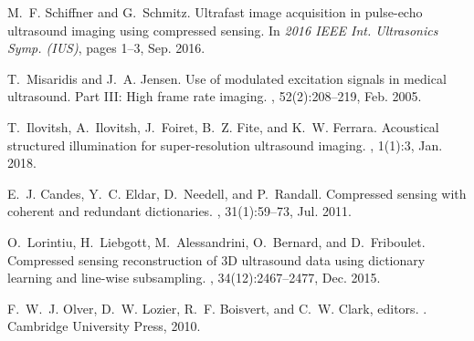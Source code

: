 \documentclass[10pt,twocolumn,romanappendices,final]{IEEEtran}
\begin{document}
\begin{thebibliography}{100}
M.~F. Schiffner and G.~Schmitz.
\newblock Ultrafast image acquisition in pulse-echo ultrasound imaging using
  compressed sensing.
\newblock In {\em 2016 IEEE Int. Ultrasonics Symp. (IUS)}, pages 1--3, Sep.
  2016.

T.~Misaridis and J.~A. Jensen.
\newblock Use of modulated excitation signals in medical ultrasound. {P}art
  {III}: {H}igh frame rate imaging.
,
  52(2):208--219, Feb. 2005.

\enlargethispage{-203mm}

T.~Ilovitsh, A.~Ilovitsh, J.~Foiret, B.~Z. Fite, and K.~W. Ferrara.
\newblock Acoustical structured illumination for super-resolution ultrasound
  imaging.
, 1(1):3, Jan. 2018.

E.~J. Candes, Y.~C. Eldar, D.~Needell, and P.~Randall.
\newblock Compressed sensing with coherent and redundant dictionaries.
, 31(1):59--73, Jul. 2011.

O.~Lorintiu, H.~Liebgott, M.~Alessandrini, O.~Bernard, and D.~Friboulet.
\newblock Compressed sensing reconstruction of {3D} ultrasound data using
  dictionary learning and line-wise subsampling.
, 34(12):2467--2477, Dec. 2015.

F.~W.~J. Olver, D.~W. Lozier, R.~F. Boisvert, and C.~W. Clark, editors.
.
\newblock Cambridge University Press, 2010.

\end{thebibliography}
\end{document}
